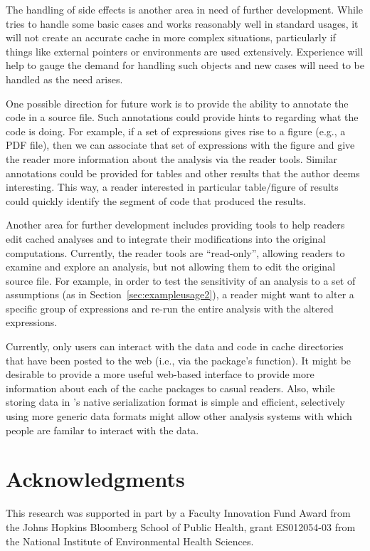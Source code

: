 \documentclass[nojss]{jss}
\begin{document}
The handling of side effects is another area in need of further
development.  While  tries to handle some basic cases and
works reasonably well in standard usages, it will not create an
accurate cache in more complex situations, particularly if things like
external pointers or environments are used extensively.  Experience
will help to gauge the demand for handling such objects and new cases
will need to be handled as the need arises.

One possible direction for future work is to provide the ability to
annotate the code in a source file.  Such annotations could provide
hints to  regarding what the code is doing.  For example,
if a set of expressions gives rise to a figure (e.g., a PDF file), then
we can associate that set of expressions with the figure and give the
reader more information about the analysis via the reader tools.
Similar annotations could be provided for tables and other results
that the author deems interesting.  This way, a reader interested in
particular table/figure of results could quickly identify the segment
of code that produced the results.

Another area for further development includes providing tools to help
readers edit cached analyses and to integrate their modifications into
the original computations.  Currently, the reader tools are
``read-only'', allowing readers to examine and explore an analysis,
but not allowing them to edit the original source file.  For example,
in order to test the sensitivity of an analysis to a set of
assumptions (as in Section~\ref{sec:exampleusage2}), a reader might
want to alter a specific group of  expressions and re-run
the entire analysis with the altered expressions.

Currently, only  users can interact with the data and code
in cache directories that have been posted to the web (i.e., via the
 package's  function).  It might be
desirable to provide a more useful web-based interface to provide more
information about each of the cache packages to casual readers.  Also,
while storing data in 's native serialization format is
simple and efficient, selectively using more generic data formats
might allow other analysis systems with which people are familar to
interact with the data.

\section*{Acknowledgments}

This research was supported in part by a Faculty Innovation Fund Award
from the Johns Hopkins Bloomberg School of Public Health, grant
ES012054-03 from the National Institute of Environmental Health
Sciences.


\end{document}
